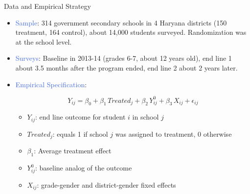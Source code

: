 \documentclass[aspectratio=169,11pt]{beamer}
\begin{document}
\begin{frame}{Data and Empirical Strategy}
  \begin{itemize}
    \item \textcolor{RoyalBlue}{Sample}: 314 government secondary schools in 4 Haryana districts (150 treatment, 164 control), about 14,000 students surveyed. Randomization was at the school level.
    \item \textcolor{RoyalBlue}{Surveys}: Baseline in 2013-14 (grades 6-7, about 12 years old), end line 1 about 3.5 months after the program ended, end line 2 about 2 years later.

    \item \textcolor{RoyalBlue}{Empirical Specification}: 

\begin{equation}
Y_{ij} = \beta_0 + \beta_1 \, Treated_j + \beta_2 \, Y^0_{ij} + \beta_3 \, X_{ij} + \epsilon_{ij}
\end{equation}

\begin{itemize}
    \item $Y_{ij}$: end line outcome for student $i$ in school $j$
    \item $Treated_j$: equals 1 if school $j$ was assigned to treatment, 0 otherwise
    \item $\beta_1$: Average treatment effect 
    \item $Y^0_{ij}$: baseline analog of the outcome
    \item $X_{ij}$: grade-gender and district-gender fixed effects
   
\end{itemize}


  \end{itemize}
\end{frame}
\end{document}
